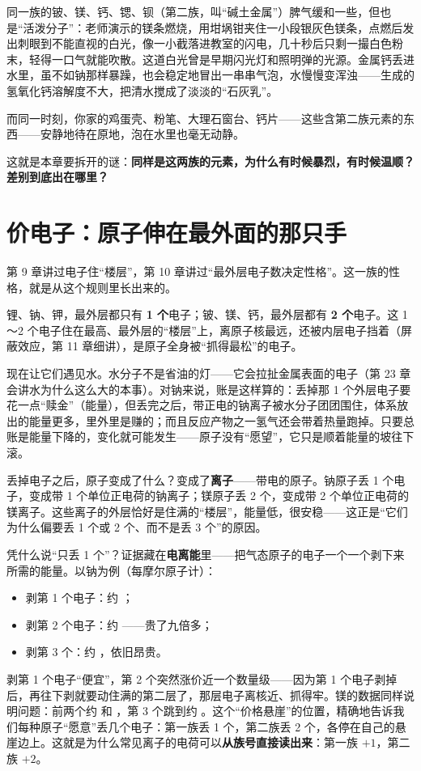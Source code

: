 同一族的铍、镁、钙、锶、钡（第二族，叫“碱土金属”）脾气缓和一些，但也是“活泼分子”：老师演示的镁条燃烧，用坩埚钳夹住一小段银灰色镁条，点燃后发出刺眼到不能直视的白光，像一小截落进教室的闪电，几十秒后只剩一撮白色粉末，轻得一口气就能吹散。这道白光曾是早期闪光灯和照明弹的光源。金属钙丢进水里，虽不如钠那样暴躁，也会稳定地冒出一串串气泡，水慢慢变浑浊——生成的氢氧化钙溶解度不大，把清水搅成了淡淡的“石灰乳”。

而同一时刻，你家的鸡蛋壳、粉笔、大理石窗台、钙片——这些含第二族元素的东西——安静地待在原地，泡在水里也毫无动静。

这就是本章要拆开的谜：\textbf{同样是这两族的元素，为什么有时候暴烈，有时候温顺？差别到底出在哪里？}

\section{价电子：原子伸在最外面的那只手}

第 9 章讲过电子住“楼层”，第 10 章讲过“最外层电子数决定性格”。这一族的性格，就是从这个规则里长出来的。

锂、钠、钾，最外层都只有 \textbf{1 个}电子；铍、镁、钙，最外层都有 \textbf{2 个}电子。这 1～2 个电子住在最高、最外层的“楼层”上，离原子核最远，还被内层电子挡着（屏蔽效应，第 11 章细讲），是原子全身被“抓得最松”的电子。

现在让它们遇见水。水分子不是省油的灯——它会拉扯金属表面的电子（第 23 章会讲水为什么这么大的本事）。对钠来说，账是这样算的：丢掉那 1 个外层电子要花一点“赎金”（能量），但丢完之后，带正电的钠离子被水分子团团围住，体系放出的能量更多，里外里是赚的；而且反应产物之一氢气还会带着热量跑掉。只要总账是能量下降的，变化就可能发生——原子没有“愿望”，它只是顺着能量的坡往下滚。

丢掉电子之后，原子变成了什么？变成了\textbf{离子}——带电的原子。钠原子丢 1 个电子，变成带 1 个单位正电荷的钠离子；镁原子丢 2 个，变成带 2 个单位正电荷的镁离子。这些离子的外层恰好是住满的“楼层”，能量低，很安稳——这正是“它们为什么偏要丢 1 个或 2 个、而不是丢 3 个”的原因。

\begin{qiaoliang}
凭什么说“只丢 1 个”？证据藏在\textbf{电离能}里——把气态原子的电子一个一个剥下来所需的能量。以钠为例（每摩尔原子计）：
\begin{itemize}[itemsep=1pt]
\item 剥第 1 个电子：约 ；
\item 剥第 2 个电子：约 ——贵了九倍多；
\item 剥第 3 个：约 ，依旧昂贵。
\end{itemize}
剥第 1 个电子“便宜”，第 2 个突然涨价近一个数量级——因为第 1 个电子剥掉后，再往下剥就要动住满的第二层了，那层电子离核近、抓得牢。镁的数据同样说明问题：前两个约  和 ，第 3 个跳到约 。这个“价格悬崖”的位置，精确地告诉我们每种原子“愿意”丢几个电子：第一族丢 1 个，第二族丢 2 个，各停在自己的悬崖边上。这就是为什么常见离子的电荷可以\textbf{从族号直接读出来}：第一族 $+1$，第二族 $+2$。
\end{qiaoliang}

